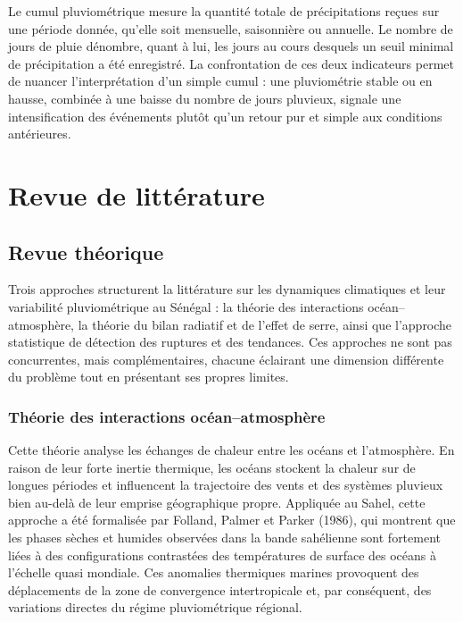 Le cumul pluviométrique mesure la quantité totale de précipitations reçues sur une période donnée, qu'elle soit mensuelle, saisonnière ou annuelle. Le nombre de jours de pluie dénombre, quant à lui, les jours au cours desquels un seuil minimal de précipitation a été enregistré. La confrontation de ces deux indicateurs permet de nuancer l'interprétation d'un simple cumul : une pluviométrie stable ou en hausse, combinée à une baisse du nombre de jours pluvieux, signale une intensification des événements plutôt qu'un retour pur et simple aux conditions antérieures.

\section{Revue de littérature}

\subsection{Revue théorique}

Trois approches structurent la littérature sur les dynamiques climatiques et leur variabilité pluviométrique au Sénégal : la théorie des interactions océan--atmosphère, la théorie du bilan radiatif et de l'effet de serre, ainsi que l'approche statistique de détection des ruptures et des tendances. Ces approches ne sont pas concurrentes, mais complémentaires, chacune éclairant une dimension différente du problème tout en présentant ses propres limites.

\subsubsection{Théorie des interactions océan--atmosphère}

Cette théorie analyse les échanges de chaleur entre les océans et l'atmosphère. En raison de leur forte inertie thermique, les océans stockent la chaleur sur de longues périodes et influencent la trajectoire des vents et des systèmes pluvieux bien au-delà de leur emprise géographique propre. Appliquée au Sahel, cette approche a été formalisée par Folland, Palmer et Parker (1986), qui montrent que les phases sèches et humides observées dans la bande sahélienne sont fortement liées à des configurations contrastées des températures de surface des océans à l'échelle quasi mondiale. Ces anomalies thermiques marines provoquent des déplacements de la zone de convergence intertropicale et, par conséquent, des variations directes du régime pluviométrique régional.

